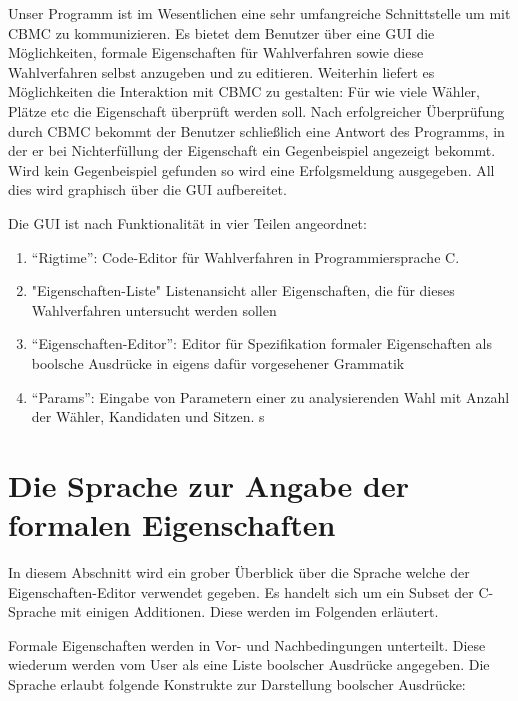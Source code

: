 \documentclass[a4paper]{scrreprt}
\begin{document}
Unser Programm ist im Wesentlichen eine sehr umfangreiche Schnittstelle um mit \ac{CBMC} zu kommunizieren. Es bietet dem Benutzer über eine \ac{GUI} die Möglichkeiten, formale Eigenschaften für Wahlverfahren sowie diese Wahlverfahren selbst anzugeben und zu editieren. Weiterhin liefert es Möglichkeiten die Interaktion mit \ac{CBMC} zu gestalten: Für wie viele Wähler, Plätze etc die Eigenschaft überprüft werden soll. Nach erfolgreicher Überprüfung durch \ac{CBMC} bekommt der Benutzer schließlich eine Antwort des Programms, in der er bei Nichterfüllung der Eigenschaft ein Gegenbeispiel angezeigt bekommt. Wird kein Gegenbeispiel gefunden so wird eine Erfolgsmeldung ausgegeben. All dies wird graphisch über die \ac{GUI} aufbereitet.

Die \ac{GUI} ist nach Funktionalität in vier Teilen angeordnet:
\begin{enumerate}
\item "`Rigtime"': Code-Editor für Wahlverfahren in Programmiersprache C.
\item "Eigenschaften-Liste" Listenansicht aller Eigenschaften, die für dieses Wahlverfahren untersucht werden sollen
\item "`Eigenschaften-Editor"': Editor für Spezifikation formaler Eigenschaften als boolsche Ausdrücke in eigens dafür vorgesehener Grammatik
\item "`Params"': Eingabe von Parametern einer zu analysierenden Wahl mit Anzahl der Wähler, Kandidaten und Sitzen. s
\end{enumerate}

\section{Die Sprache zur Angabe der formalen Eigenschaften} \label{Sprache-für-formale-Eigenschaften}
In diesem Abschnitt wird ein grober Überblick über die Sprache welche der Eigenschaften-Editor verwendet gegeben. Es handelt sich um ein Subset der C-Sprache mit einigen Additionen. Diese werden im Folgenden erläutert. 

Formale Eigenschaften werden in Vor- und Nachbedingungen unterteilt. Diese wiederum werden vom User als eine Liste boolscher Ausdrücke angegeben. Die Sprache erlaubt folgende Konstrukte zur Darstellung boolscher Ausdrücke:
\end{document}
